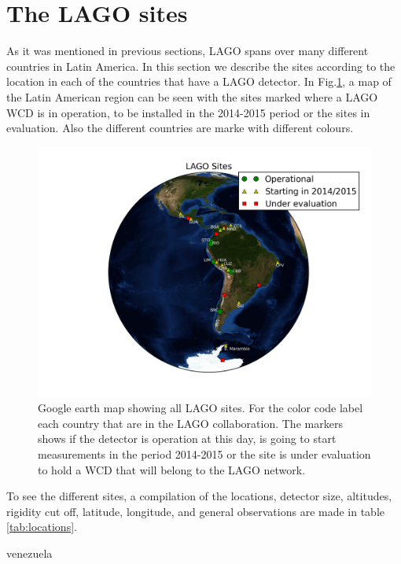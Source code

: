\section{The LAGO sites}\label{sec:sites}

As it was mentioned in previous sections, LAGO spans over many different
countries in Latin America. In this section we describe the sites according to
the location in each of the countries that have a LAGO detector. In
Fig.\ref{fig:lago-map}, a map of the Latin American region can be seen with the
sites marked where a LAGO WCD is in operation, to be installed in the 2014-2015
period or the sites in evaluation. Also the different countries are marke with
different colours.

\begin{figure}
\includegraphics[width=.9\textwidth]{images/LagoMapa.jpg}
\caption{Google earth map showing all LAGO sites. For the color code label each
country that are in the LAGO collaboration. The markers shows if the detector
is operation at this day, is going to start measurements in the period
2014-2015 or the site is under evaluation to hold a WCD that will belong to the
LAGO network.} \label{fig:lago-map}
\end{figure}

To see the different sites, a compilation of the locations, detector size,
altitudes, rigidity cut off, latitude, longitude, and general observations are
made in table \ref{tab:locations}.

venezuela

